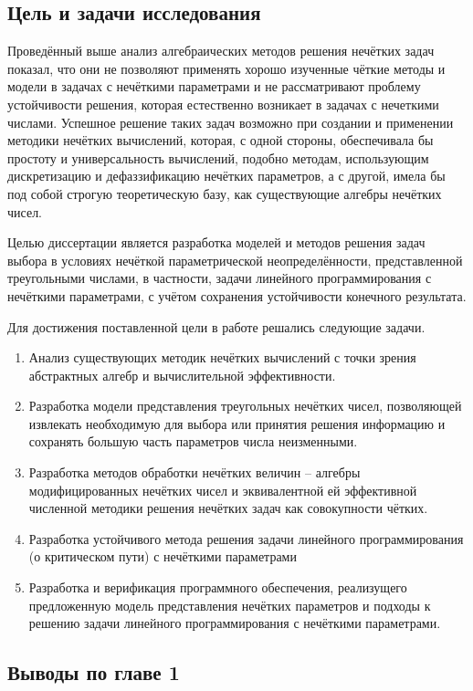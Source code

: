 \subsection{Цель и задачи исследования}

Проведённый выше анализ алгебраических методов решения нечётких задач показал, что они не позволяют применять хорошо изученные чёткие методы и модели в задачах с нечёткими параметрами и не рассматривают проблему устойчивости решения, которая естественно возникает в задачах с нечеткими числами. Успешное решение таких задач возможно при создании и применении методики нечётких вычислений, которая, с одной стороны, обеспечивала бы простоту и универсальность вычислений, подобно методам, использующим дискретизацию и дефаззификацию нечётких параметров, а с другой, имела бы под собой строгую теоретическую базу, как существующие алгебры нечётких чисел.

Целью диссертации является разработка моделей и методов решения задач выбора в условиях нечёткой параметрической неопределённости, представленной треугольными числами, в частности, задачи линейного программирования с нечёткими параметрами, с учётом сохранения устойчивости конечного результата.

Для достижения поставленной цели в работе решались следующие задачи.

\begin{enumerate}
	\item Анализ существующих методик нечётких вычислений с точки зрения абстрактных алгебр и вычислительной эффективности.
	\item Разработка модели представления треугольных нечётких чисел, позволяющей извлекать необходимую для выбора или принятия решения информацию и сохранять большую часть параметров числа неизменными. 
	\item Разработка методов обработки нечётких величин – алгебры модифицированных нечётких чисел и эквивалентной ей эффективной численной методики решения нечётких задач как совокупности чётких.
	\item Разработка устойчивого метода решения задачи линейного программирования (о критическом пути) с нечёткими параметрами
	\item Разработка и верификация программного обеспечения, реализущего предложенную модель представления нечётких параметров и подходы к решению задачи линейного программирования с нечёткими параметрами.
\end{enumerate}

\subsection{Выводы по главе 1}
